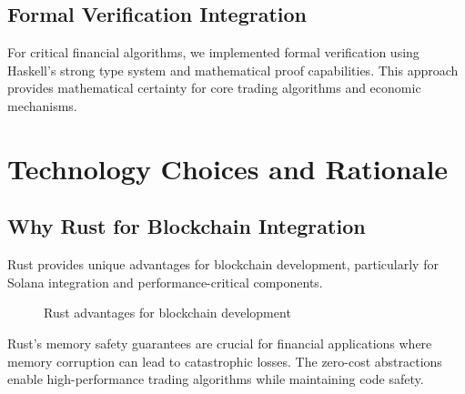 \documentclass[11pt,a4paper]{article}
\begin{document}
\subsection{Formal Verification Integration}

For critical financial algorithms, we implemented formal verification using Haskell's strong type system and mathematical proof capabilities. This approach provides mathematical certainty for core trading algorithms and economic mechanisms.

\section{Technology Choices and Rationale}

\subsection{Why Rust for Blockchain Integration}

Rust provides unique advantages for blockchain development, particularly for Solana integration and performance-critical components.

\begin{figure}[h]
\centering
{}
\caption{Rust advantages for blockchain development}
\end{figure}

Rust's memory safety guarantees are crucial for financial applications where memory corruption can lead to catastrophic losses. The zero-cost abstractions enable high-performance trading algorithms while maintaining code safety.
\end{document}
